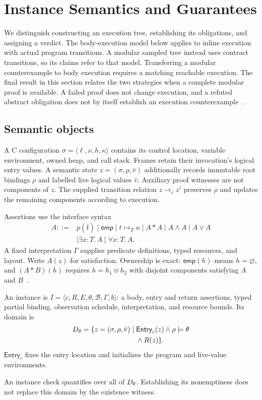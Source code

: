 \section{Instance Semantics and Guarantees}
\label{sec:semantics}
We distinguish constructing an execution tree, establishing its obligations,
and assigning a verdict. The body-execution model below applies to inline
execution with actual program transitions. A modular sampled tree instead
uses contract transitions, so its claims refer to that model.
Transferring a modular counterexample to body execution requires a matching
reachable execution. The final result in this section relates the two
strategies when a complete modular proof is available. A failed proof does not change execution, and a
refuted abstract obligation does not by itself establish an execution
counterexample~\cite{maksimovic2023exact}.

\subsection{Semantic objects}
A C configuration $\sigma=\langle\ell,\nu,h,\kappa\rangle$ contains its
control location, variable environment, owned heap, and call stack.
Frames retain their invocation's logical entry values.
A semantic state $z=(\sigma,\rho,\bar v)$ additionally records immutable
root bindings $\rho$ and labelled live logical values $\bar v$.
Auxiliary proof witnesses are not components of $z$.
The supplied transition relation $z\to_c z'$ preserves $\rho$ and updates
the remaining components according to execution.

Assertions use the interface syntax
\[
\begin{split}
 A::={}&p(\bar t)\mid\mathsf{emp}\mid t\mapsto_T u
       \mid A*A\mid A\land A\mid A\lor A\\
      &\mid\exists x:T.\,A\mid\forall x:T.\,A .
\end{split}
\]
A fixed interpretation $\Gamma$ supplies predicate definitions, typed
resources, and layout. Write $A(z)$ for satisfaction.
Ownership is exact: $\mathsf{emp}(h)$ means $h=\varnothing$, and
$(A*B)(h)$ requires $h=h_1\uplus h_2$ with disjoint components satisfying
$A$ and $B$~\cite{reynolds2002separation}.

\begin{definition}
An instance is $I=\langle c,R,E,\theta,\mathcal B,\Gamma,b\rangle$:
a body, entry and return assertions, typed partial binding, observation
schedule, interpretation, and resource bounds. Its domain is
\begin{equation}
\begin{split}
D_\theta=\{z=(\sigma,\rho,\bar v)\mid {}&
 \mathsf{Entry}_c(z)\land\rho\models\theta\\
 &{}\land R(z)\}.
\end{split}
\end{equation}
$\mathsf{Entry}_c$ fixes the entry location and initializes the program
and live-value environments.
\end{definition}
An instance check quantifies over all of $D_\theta$. Establishing its
nonemptiness does not replace this domain by the existence witness.

